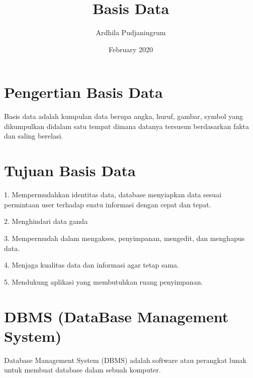 \documentclass{article}
\title{Basis Data}
\author{Ardhila Pudjaningrum}
\date{February 2020}
\begin{document}
\maketitle

\section{Pengertian Basis Data}
Basis data adalah kumpulan data berupa angka, huruf, gambar, symbol yang dikumpulkan didalam satu tempat dimana datanya tersusun berdasarkan fakta dan saling berelasi.

\section{Tujuan Basis Data}
1. Mempermudahkan identitas data, database menyiapkan data sesuai permintaan user terhadap suatu informasi dengan cepat dan tepat.

2. Menghindari data ganda

3. Mempermudah dalam mengakses, penyimpanan, mengedit, dan menghapus data.

4. Menjaga kualitas data dan informasi agar tetap sama.

5. Mendukung aplikasi yang membutuhkan ruang penyimpanan.

\section{DBMS (DataBase Management System)}
Database Management System (DBMS) adalah software atau perangkat lunak untuk membuat database dalam sebuah komputer.
\end{document}

